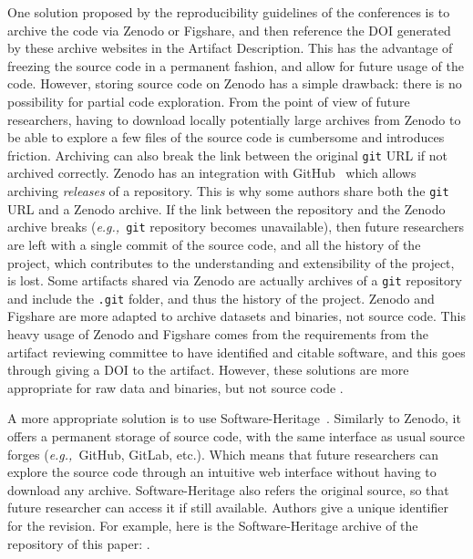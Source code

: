 \documentclass[sigconf,natbib=false]{acmart}
\newcommand{\eg}{\emph{e.g.,}}
\newcommand{\ad}{Artifact Description}
\begin{document}
One solution proposed by the reproducibility guidelines of the conferences is to archive the code via Zenodo or Figshare, and then reference the DOI generated by these archive websites in the \ad.
This has the advantage of freezing the source code in a permanent fashion, and allow for future usage of the code.
However, storing source code on Zenodo has a simple drawback: there is no possibility for partial code exploration.
From the point of view of future researchers, having to download locally potentially large archives from Zenodo to be able to explore a few files of the source code is cumbersome and introduces friction.
Archiving can also break the link between the original \texttt{git} URL if not archived correctly.
Zenodo has an integration with GitHub\ \cite{github_zenodo} which allows archiving \emph{releases} of a repository.
This is why some authors share both the \texttt{git} URL and a Zenodo archive.
If the link between the repository and the Zenodo archive breaks (\eg\ \texttt{git} repository becomes unavailable), then future researchers are left with a single commit of the source code, and all the history of the project, which contributes to the understanding and extensibility of the project, is lost.
Some artifacts shared via Zenodo are actually archives of a \texttt{git} repository and include the \texttt{.git} folder, and thus the history of the project.
Zenodo and Figshare are more adapted to archive datasets and binaries, not source code.
This heavy usage of Zenodo and Figshare comes from the requirements from the artifact reviewing committee to have identified and citable software, and this goes through giving a DOI to the artifact.
However, these solutions are more appropriate for raw data and binaries, but not source code \cite{alliez2019attributing, software_heritage_2017}.

A more appropriate solution is to use Software-Heritage\ \cite{swheritage, di2017software}.
Similarly to Zenodo, it offers a permanent storage of source code, with the same interface as usual source forges (\eg\ GitHub, GitLab, etc.).
Which means that future researchers can explore the source code through an intuitive web interface without having to download any archive.
Software-Heritage also refers the original source, so that future researcher can access it if still available.
Authors give a unique identifier for the revision. 
For example, here is the Software-Heritage archive of the repository of this paper: \cite{artefact-lifetime}.
\end{document}
